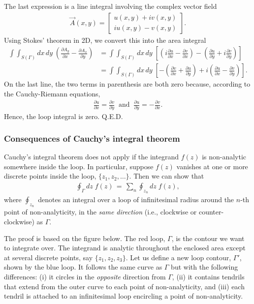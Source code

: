 \documentclass[10pt,a4paper]{article}
\begin{document}
The last expression is a line integral involving the complex vector
field
\begin{align}
  \vec{A}(x,y) = \begin{bmatrix}u(x,y) + i v(x,y) \\ iu(x,y) - v(x,y)\end{bmatrix}.
\end{align}
Using Stokes' theorem in 2D, we convert this into the area integral
\begin{align}
  \int\!\!\!\int_{S(\Gamma)} dx \,dy \; \left(\frac{\partial A_y}{\partial x} - \frac{\partial A_x}{\partial y}\right) &= \int\!\!\!\int_{S(\Gamma)} dx \,dy \; \left[\left(i\frac{\partial u}{\partial x} - \frac{\partial v}{\partial x}\right) - \left(\frac{\partial u}{\partial y} + i \frac{\partial v}{\partial y}\right)\right] \\
  &= \int\!\!\!\int_{S(\Gamma)} dx \,dy \; \left[- \left(\frac{\partial v}{\partial x} + \frac{\partial u}{\partial y} \right) + i\left(\frac{\partial u}{\partial x} - \frac{\partial v}{\partial y}\right)\right].
\end{align}
On the last line, the two terms in parenthesis are both zero because,
according to the Cauchy-Riemann equations,
\begin{align}
  \frac{\partial u}{\partial x} = \frac{\partial v}{\partial y}\;\;\mathrm{and}\;\; \frac{\partial u}{\partial y} = -\frac{\partial v}{\partial x}.
\end{align}
Hence, the loop integral is zero. Q.E.D.

\subsubsection{Consequences of Cauchy's integral theorem}
\label{consequences-of-cauchys-integral-theorem}

Cauchy's integral theorem does not apply if the integrand $f(z)$ is
non-analytic somewhere inside the loop.  In particular, suppose $f(z)$
vanishes at one or more discrete points inside the loop, $\{z_1, z_2,
\dots\}$. Then we can show that
\begin{align}
  \oint_\Gamma dz\; f(z) \,=\, \sum_{n} \oint_{z_n} dz\; f(z),
  \label{eq:cit_result}
\end{align}
where $\oint_{z_n}$ denotes an integral over a loop of infinitesimal
radius around the $n$-th point of non-analyticity, in the \textit{same
  direction} (i.e., clockwise or counter-clockwise) as $\Gamma$.

The proof is based on the figure below. The red loop, $\Gamma$, is the
contour we want to integrate over. The integrand is analytic
throughout the enclosed area except at several discrete points, say
$\{z_1, z_2, z_3\}$. Let us define a new loop contour, $\Gamma'$,
shown by the blue loop. It follows the same curve as $\Gamma$ but with
the following differences: (i) it circles in the \textit{opposite}
direction from $\Gamma$, (ii) it contains tendrils that extend from
the outer curve to each point of non-analyticity, and (iii) each
tendril is attached to an infinitesimal loop encircling a point of
non-analyticity.
\end{document}
